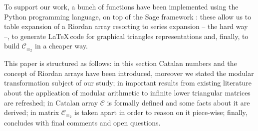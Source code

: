 To support our work, a bunch of functions have been implemented using the Python 
programming language, on top of the Sage framework 
\cite{sage}: these allow us to table expansion of a Riordan array
resorting to series expansion -- the hard way --, to generate \LaTeX\,code
for graphical triangles representations and, finally, to build $\mathcal{C}_{\equiv_{2}}$ 
in a cheaper way.




This paper is structured as follows: in this section 
Catalan numbers and the concept of Riordan arrays have been introduced, moreover we stated the modular
transformation subject of our study; in  important
results from existing literature about the application of modular
arithmetic to infinite lower triangular matrices are refreshed;
in  Catalan array $\mathcal{C}$ is formally defined
and some facts about it are derived; 
in  matrix $\mathcal{C}_{\equiv_{2}}$ is taken apart 
in order to reason on it piece-wise; finally,  concludes
with final comments and open questions.

